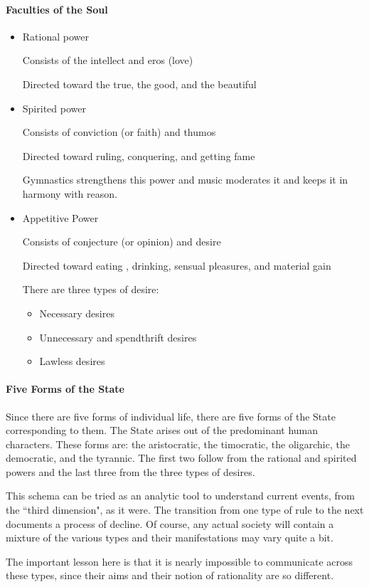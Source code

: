 \paragraph{Faculties of the Soul}
\begin{itemize}
\item Rational power

Consists of the intellect and eros (love)

Directed toward the true, the good, and the beautiful 
\item Spirited power

Consists of conviction (or faith) and thumos

Directed toward ruling, conquering, and getting fame

Gymnastics strengthens this power and music moderates it and keeps it in harmony with reason. 
\item Appetitive Power

Consists of conjecture (or opinion) and desire

Directed toward eating , drinking, sensual pleasures, and material gain

There are three types of desire:

\begin{itemize}
\item Necessary desires 
\item Unnecessary and spendthrift desires 
\item Lawless desires 
\end{itemize}
\end{itemize}
\paragraph{Five Forms of the State}
Since there are five forms of individual life, there are five forms of the State corresponding to them. The State arises out of the predominant human characters. These forms are: the aristocratic, the timocratic, the oligarchic, the democratic, and the tyrannic. The first two follow from the rational and spirited powers and the last three from the three types of desires.

This schema can be tried as an analytic tool to understand current events, from the ``third dimension", as it were. The transition from one type of rule to the next documents a process of decline. Of course, any actual society will contain a mixture of the various types and their manifestations may vary quite a bit.

The important lesson here is that it is nearly impossible to communicate across these types, since their aims and their notion of rationality are so different.

